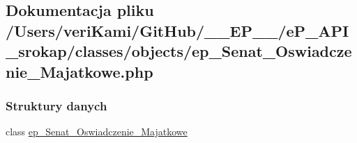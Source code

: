 \hypertarget{ep___senat___oswiadczenie___majatkowe_8php}{\subsection{Dokumentacja pliku /\-Users/veri\-Kami/\-Git\-Hub/\-\_\-\-\_\-\-E\-P\-\_\-\-\_\-/e\-P\-\_\-\-A\-P\-I\-\_\-srokap/classes/objects/ep\-\_\-\-Senat\-\_\-\-Oswiadczenie\-\_\-\-Majatkowe.php}
\label{ep___senat___oswiadczenie___majatkowe_8php}
}
\subsubsection*{Struktury danych}
\begin{DoxyCompactItemize}
\item 
class \hyperlink{classep___senat___oswiadczenie___majatkowe}{ep\-\_\-\-Senat\-\_\-\-Oswiadczenie\-\_\-\-Majatkowe}
\end{DoxyCompactItemize}
